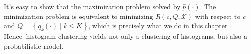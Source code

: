 It's easy to show that the maximization problem solved by $\hat{p}(\cdot)$. The minimization problem is equivalent to minimizing $R(c,Q, \mathcal{X})$ with respect to $c$ and $Q = \left\{q_k(\cdot) \mid k \leq K\right\}$, which is precisely what we do in this chapter. Hence, histogram clustering yields not only a clustering of histograms, but also a probabilistic model.